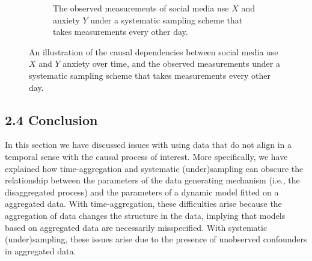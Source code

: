 \documentclass[man]{apa7} %
\begin{document}
\begin{figure}
\begin{subfigure}{\textwidth}
        \caption{The observed measurements of social media use $X$ and anxiety $Y$ under a systematic sampling scheme that takes measurements every other day.}
        \label{fig:DAG_ARX1_missingFrames_observed}
    \end{subfigure}
     \caption{An illustration of the causal dependencies between social media use $X$ and $Y$ anxiety over time, and the observed measurements under a systematic sampling scheme that takes measurements every other day.}
    \label{fig:DAG_ARX1_missingFrames}
\end{figure}

\subsection{2.4 Conclusion}
In this section we have discussed issues with using data that do not align in a temporal sense with the causal process of interest. More specifically, we have explained how time-aggregation and systematic (under)sampling can obscure the relationship between the parameters of the data generating mechanism (i.e., the disaggregated process) and the parameters of a dynamic model fitted on a aggregated data. With time-aggregation, these difficulties arise because the aggregation of data changes the structure in the data, implying that models based on aggregated data are necessarily misspecified. With systematic (under)sampling, these issues arise due to the presence of unobserved confounders in aggregated data. 
   
\end{document}

